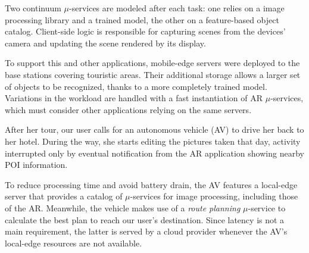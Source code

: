 Two continuum $\mu$-services are modeled after each task: one relies on a image processing library and a trained model, the other on a feature-based object catalog. Client-side logic is responsible for capturing scenes from the devices' camera and updating the scene rendered by its display.


To support this and other applications, mobile-edge servers were deployed to the base stations covering touristic areas. Their additional storage allows a larger set of objects to be recognized, thanks to a more completely trained model. Variations in the workload are handled with a fast instantiation of AR $\mu$-services, which must consider other applications relying on the same servers.


After her tour, our user calls for an autonomous vehicle (AV) to drive her back to her hotel. During the way, she starts editing the pictures taken that day, activity interrupted only by eventual notification from the AR application showing nearby POI information. 

To reduce processing time and avoid battery drain, the AV features a local-edge server that provides a catalog of $\mu$-services for image processing, including those of the AR. Meanwhile, the vehicle makes use of a \textit{route planning} $\mu$-service
to calculate the best plan to reach our user's destination. Since latency is not a main requirement, the latter is served by a cloud provider whenever the AV's local-edge resources are not available. 



